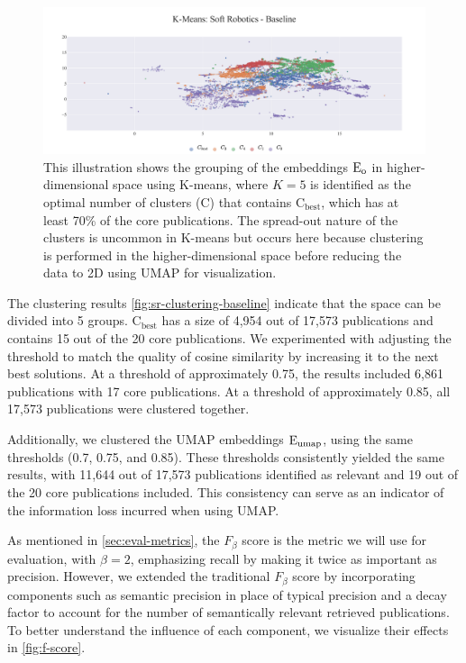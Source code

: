 \begin{figure}[!h]
	\hspace*{-1cm}	
	\includegraphics[scale=0.45]{pics/sr-clustering-baseline.pdf}
	\caption[Semantic Clustering: Soft Robotics]{This illustration shows the grouping of the embeddings $\mathop{}\!\mathrm{E_{o}}$ in higher-dimensional space using K-means, where $K=5$ is identified as the optimal number of clusters (C) that contains $\text{C}_{\text{best}}$, which has at least 70\% of the core publications. The spread-out nature of the clusters is uncommon in K-means but occurs here because clustering is performed in the higher-dimensional space before reducing the data to 2D using UMAP for visualization.}\label{fig:sr-clustering-baseline}
\end{figure}

The clustering results \autoref{fig:sr-clustering-baseline} indicate that the space can be divided into 5 groups. $\text{C}_{\text{best}}$ has a size of 4,954 out of 17,573 publications and contains 15 out of the 20 core publications. We experimented with adjusting the threshold to match the quality of cosine similarity by increasing it to the next best solutions. At a threshold of approximately 0.75, the results included 6,861 publications with 17 core publications. At a threshold of approximately 0.85, all 17,573 publications were clustered together.

Additionally, we clustered the UMAP embeddings $\mathop{}\!\mathrm{E_{umap}}$, using the same thresholds (0.7, 0.75, and 0.85). These thresholds consistently yielded the same results, with 11,644 out of 17,573 publications identified as relevant and 19 out of the 20 core publications included. This consistency can serve as an indicator of the information loss incurred when using UMAP.

As mentioned in \autoref{sec:eval-metrics}, the $F_{\beta}$ score is the metric we will use for evaluation, with $\beta=2$, emphasizing recall by making it twice as important as precision. However, we extended the traditional $F_{\beta}$ score by incorporating components such as semantic precision in place of typical precision and a decay factor to account for the number of semantically relevant retrieved publications. To better understand the influence of each component, we visualize their effects in \autoref{fig:f-score}.

